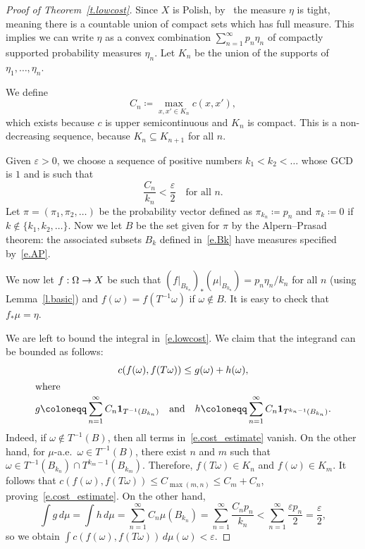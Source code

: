 \documentclass[10pt]{amsart}
\theoremstyle{definition}\newtheorem{defi}[theo]{Definition}\newtheorem{rema}[theo]{Remark}\newtheorem{exam}[theo]{Example}\newtheorem{exem}[theo]{Example}\newtheorem{nota}[theo]{Notation}
\newcommand{\bfun}{\mathbf{1}}
\renewcommand{\epsilon}{\varepsilon}
\renewcommand*{\to}{\mathchoice{\longrightarrow}{\rightarrow}{\rightarrow}{\rightarrow}}
\begin{document}
\begin{proof}[Proof of Theorem~\ref{t.lowcost}]
Since $X$ is Polish, by~\cite[p.~8, Theorem~1.3]{billingsley} the measure $\eta$ is tight, meaning there is a countable union of compact sets which has full measure. This implies we can write $\eta$ as a convex combination $\sum_{n=1}^\infty p_n \eta_n$ of compactly supported probability measures $\eta_n$. Let $K_n$ be the union of the supports of $\eta_1,\dots,\eta_n$.

We define
\begin{equation}
C_n \coloneqq \max_{x,x' \in K_n}c(x,x'),
\end{equation}
which exists because $c$ is upper semicontinuous and $K_n$ is compact. This is a non-decreasing sequence, because $K_n \subseteq K_{n+1}$ for all $n$.

Given $\epsilon > 0$, we choose a sequence of positive numbers $k_1 < k_2 < \dots$ whose GCD is $1$ and is such that
\begin{equation}\label{e.stoppedtimes}
\frac{C_n}{k_n} < \frac{\epsilon}{2} \quad \text{for all $n$.}
\end{equation}
Let $\pi = (\pi_1,\pi_2,\dots)$ be the probability vector defined as $\pi_{k_n} \coloneqq p_n$ and $\pi_k \coloneqq 0$ if $k \notin \{ k_1,k_2,\dots\}$. Now we let $B$ be the set given for $\pi$ by the Alpern--Prasad theorem: the associated subsets $B_k$ defined in~\eqref{e.Bk} have measures specified by~\eqref{e.AP}.

We now let $f:\Omega \to X$ be such that $(f|_{B_{k_n}})_{*}(\mu|_{B_{k_n}}) = p_n\eta_n/k_n$ for all $n$ (using Lemma~\ref{l.basic}) and $f(\omega) = f(T^{-1}\omega)$ if $\omega \notin B$. It is easy to check that $f_*\mu = \eta$.

We are left to bound the integral in~\eqref{e.lowcost}. We claim that the integrand can be bounded as follows:
\begin{gather}\label{e.cost_estimate}
c(f(\omega), f(T\omega)) \le g(\omega) + h(\omega),\\
\intertext{where}
g \coloneqq \sum_{n=1}^\infty C_n \bfun_{T^{-1}(B_{k_n})} \quad \text{and} \quad h \coloneqq \sum_{n=1}^\infty C_n \bfun_{T^{k_n-1}(B_{k_n})}.
\end{gather}
Indeed, if $\omega \not\in T^{-1}(B)$, then all terms in~\eqref{e.cost_estimate} vanish. On the other hand, for $\mu$-a.e.\ $\omega \in T^{-1}(B)$, there exist $n$ and $m$ such that $\omega \in T^{-1}(B_{k_n}) \cap T^{k_m-1}(B_{k_m})$. Therefore, $f(T\omega) \in K_n$ and $f(\omega)\in K_m$. It follows that $c(f(\omega), f(T\omega)) \le C_{\max(m,n)} \le C_m + C_n$, proving~\eqref{e.cost_estimate}. On the other hand,
\begin{equation}
\int g \, d\mu = \int h \, d\mu = \sum_{n=1}^\infty C_n \mu(B_{k_n}) = \sum_{n=1}^\infty \frac{C_n p_n}{k_n} < \sum_{n=1}^\infty \frac{\epsilon p_n}{2} = \frac{\epsilon}{2},
\end{equation}
so we obtain $\int c(f(\omega), f(T\omega)) \, d\mu(\omega)<\epsilon$.
\end{proof}
\end{document}

